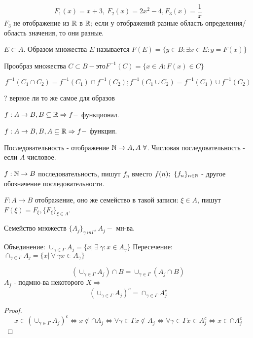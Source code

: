\documentclass[12pt]{report}
\begin{document}
\begin{ex}
$$F_1(x) = x + 3, ~F_2(x) = 2x^2 - 4, F_3(x) = \frac{1}{x}$$
$F_3$ не отображение из $\mathbb{R}$ в $\mathbb{R}$; если у отображений разные область определения/область значения, то они разные.
\end{ex}

\begin{defn}
$E \subset A$. Образом множества $E$ называется $F(E) = \{y \in B: \exists x \in E: y  = F(x)\}$
\end{defn}

\begin{defn}
Прообраз множества $C \subset B - \mbox{это} F^{-1}(C) = \{x \in A: F(x) \in C\}$
\end{defn}

\begin{st}
$$f^{-1}(C_1 \cap C_2) = f^{-1}(C_1)\cap f^{-1}(C_2); f^{-1}(C_1 \cup C_2) = f^{-1}(C_1)\cup f^{-1}(C_2)$$

? верное ли то же самое для образов
\end{st}

\begin{defn}
$f: A \to B, B \subseteq \mathbb{R} \Rightarrow f - $ функционал.

$f: A \to B, B, A \subseteq \mathbb{R} \Rightarrow f - $ функция.

Последовательность - отображение $\mathbb{N} \to A, A ~\forall$. Числовая последовательность - если $A$ числовое.
\end{defn}

\begin{name}
$f: \mathbb{N} \to B$ последовательность, пишут $f_n$ вместо $f(n); ~ \{f_n\}_{n \in \mathbb{N}}$ - другое обозначение последовательности.

$F: A \to B$ отображение, оно же семейство в такой записи: $\xi \in A$, пишут $F(\xi) = F_{\xi}, \{F_{\xi}\}_{\xi \in A}$.

Семейство множеств $\{A_j\}_{\gamma \ in \Gamma}, A_j - $ мн-ва. 
\end{name}

\begin{defn}
Объединение: $\cup_{\gamma \in \Gamma}A_j = \{x| ~\exists ~\gamma: x \in A_\gamma\}$
Пересечение: $\cap_{\gamma \in \Gamma}A_j = \{x| ~\forall ~\gamma x \in A_\gamma\}$

$$(\cup_{\gamma \in \Gamma}A_j)\cap B = \cup_{\gamma \in \Gamma}(A_j \cap B)$$
$A_j$  - подмно-ва некоторого $X \Rightarrow$
$$(\cup_{\gamma \in \Gamma} A_j)^c = \cap_{\gamma \in \Gamma} A_j^c$$
\begin{proof}
$$x \in (\cup_{\gamma \in \Gamma} A_j)^c \Leftrightarrow x \notin \cap A_j \Leftrightarrow \forall \gamma \in \Gamma x \notin A_j \Leftrightarrow \forall \gamma \in \Gamma x \in A_j^c \Leftrightarrow x \in \cap A_j^c$$
\end{proof}
\end{defn}
\end{document}
